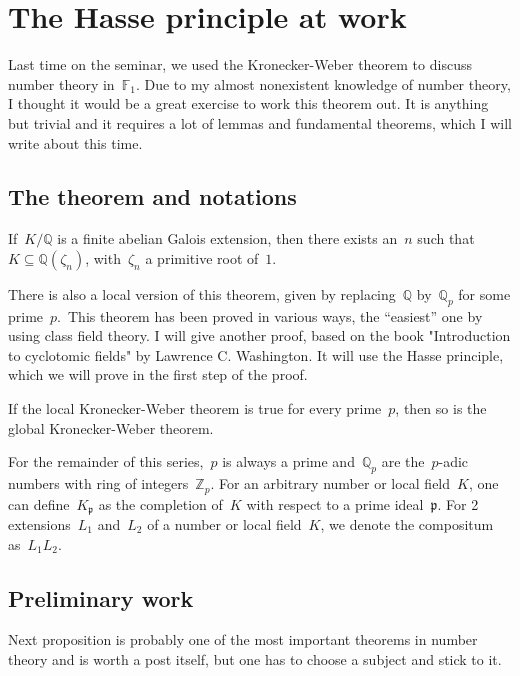 \section{The Hasse principle at work}
Last time on the seminar, we used the Kronecker-Weber theorem to discuss number theory in~$\mathbb{F}_1$. Due to my almost nonexistent knowledge of number theory, I thought it would be a great exercise to work this theorem out. It is anything but trivial and it requires a lot of lemmas and fundamental theorems, which I will write about this time.

\subsection{The theorem and notations}
\begin{theorem}
  If~$K/\mathbb{Q}$ is a finite abelian Galois extension, then there exists an~$n$ such that~$K \subseteq \mathbb{Q}(\zeta_n)$, with~$\zeta_n$ a primitive root of~$1$.
\end{theorem}

There is also a local version of this theorem, given by replacing~$\mathbb{Q}$ by~$\mathbb{Q}_p$ for some prime~$p$. This theorem has been proved in various ways, the ``easiest'' one by using class field theory. I will give another proof, based on the book "Introduction to cyclotomic fields" by Lawrence C. Washington. It will use the Hasse principle, which we will prove in the first step of the proof.

\begin{theorem}
  If the local Kronecker-Weber theorem is true for every prime~$p$, then so is the global Kronecker-Weber theorem.
\end{theorem}

For the remainder of this series,~$p$ is always a prime and~$\mathbb{Q}_p$ are the~$p$-adic numbers with ring of integers~$\mathbb{Z}_p$. For an arbitrary number or local field~$K$, one can define~$K_\mathfrak{p}$ as the completion of~$K$ with respect to a prime ideal~$\mathfrak{p}$. For 2 extensions~$L_1$ and~$L_2$ of a number or local field~$K$, we denote the compositum as~$L_1L_2$.

\subsection{Preliminary work}
Next proposition is probably one of the most important theorems in number theory and is worth a post itself, but one has to choose a subject and stick to it.

